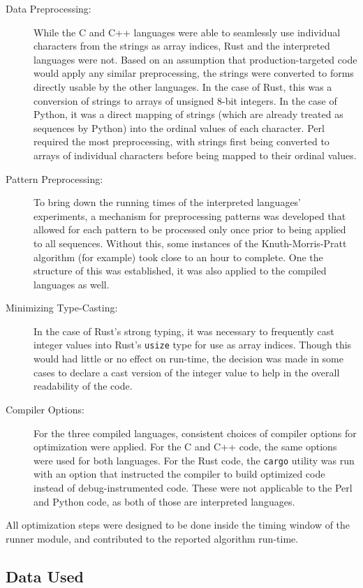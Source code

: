 \begin{description}
\item[Data Preprocessing:] While the C and C++ languages were able to seamlessly use individual characters from the strings as array indices, Rust and the interpreted languages were not. Based on an assumption that production-targeted code would apply any similar preprocessing, the strings were converted to forms directly usable by the other languages. In the case of Rust, this was a conversion of strings to arrays of unsigned 8-bit integers. In the case of Python, it was a direct mapping of strings (which are already treated as sequences by Python) into the ordinal values of each character. Perl required the most preprocessing, with strings first being converted to arrays of individual characters before being mapped to their ordinal values.
\item[Pattern Preprocessing:] To bring down the running times of the interpreted languages' experiments, a mechanism for preprocessing patterns was developed that allowed for each pattern to be processed only once prior to being applied to all sequences. Without this, some instances of the Knuth-Morris-Pratt algorithm (for example) took close to an hour to complete. One the structure of this was established, it was also applied to the compiled languages as well.
\item[Minimizing Type-Casting:] In the case of Rust's strong typing, it was necessary to frequently cast integer values into Rust's \texttt{usize} type for use as array indices. Though this would had little or no effect on run-time, the decision was made in some cases to declare a cast version of the integer value to help in the overall readability of the code.
\item[Compiler Options:] For the three compiled languages, consistent choices of compiler options for optimization were applied. For the C and C++ code, the same options were used for both languages. For the Rust code, the \texttt{cargo} utility was run with an option that instructed the compiler to build optimized code instead of debug-instrumented code. These were not applicable to the Perl and Python code, as both of those are interpreted languages.
\end{description}

All optimization steps were designed to be done inside the timing window of the runner module, and contributed to the reported algorithm run-time.

\subsection{Data Used}
\label{subsec:data}

